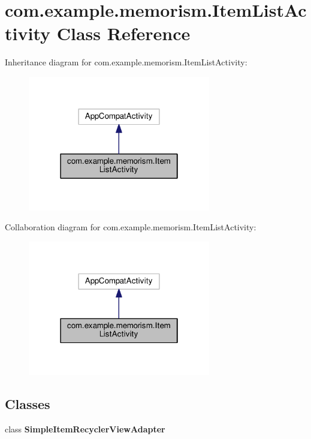 \hypertarget{classcom_1_1example_1_1memorism_1_1_item_list_activity}{}\section{com.\+example.\+memorism.\+Item\+List\+Activity Class Reference}
\label{classcom_1_1example_1_1memorism_1_1_item_list_activity}


Inheritance diagram for com.\+example.\+memorism.\+Item\+List\+Activity\+:
\nopagebreak
\begin{figure}[H]
\begin{center}
\leavevmode
\includegraphics[width=226pt]{d8/d6d/classcom_1_1example_1_1memorism_1_1_item_list_activity__inherit__graph}
\end{center}
\end{figure}


Collaboration diagram for com.\+example.\+memorism.\+Item\+List\+Activity\+:
\nopagebreak
\begin{figure}[H]
\begin{center}
\leavevmode
\includegraphics[width=226pt]{d2/d58/classcom_1_1example_1_1memorism_1_1_item_list_activity__coll__graph}
\end{center}
\end{figure}
\subsection*{Classes}
\begin{DoxyCompactItemize}
\item 
class {\bfseries Simple\+Item\+Recycler\+View\+Adapter}
\end{DoxyCompactItemize}
